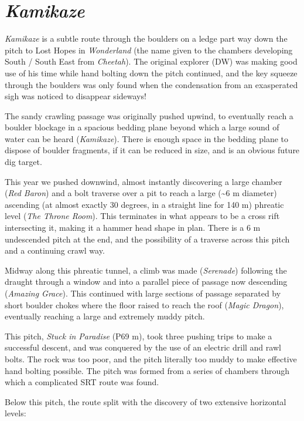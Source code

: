 \hypertarget{kamikaze}{%
\section{\texorpdfstring{\emph{Kamikaze}}{Kamikaze}}\label{kamikaze}}

\emph{Kamikaze} is a subtle route through the boulders on a ledge part
way down the pitch to Lost Hopes in \emph{Wonderland} (the name given to
the chambers developing South / South East from \emph{Cheetah}). The
original explorer (DW) was making good use of his time while hand
bolting down the pitch continued, and the key squeeze through the
boulders was only found when the condensation from an exasperated sigh
was noticed to disappear sideways!

The sandy crawling passage was originally pushed upwind, to eventually
reach a boulder blockage in a spacious bedding plane beyond which a
large sound of water can be heard (\emph{Kamikaze}). There is enough
space in the bedding plane to dispose of boulder fragments, if it can be
reduced in size, and is an obvious future dig target.

This year we pushed downwind, almost instantly discovering a large
chamber (\emph{Red Baron}) and a bolt traverse over a pit to reach a
large (\textasciitilde 6 m diameter) ascending (at almost exactly 30
degrees, in a straight line for 140 m) phreatic level (\emph{The Throne
Room}). This terminates in what appears to be a cross rift intersecting
it, making it a hammer head shape in plan. There is a 6 m undescended
pitch at the end, and the possibility of a traverse across this pitch
and a continuing crawl way.

Midway along this phreatic tunnel, a climb was made (\emph{Serenade})
following the draught through a window and into a parallel piece of
passage now descending (\emph{Amazing Grace}). This continued with large
sections of passage separated by short boulder chokes where the floor
raised to reach the roof (\emph{Magic Dragon}), eventually reaching a
large and extremely muddy pitch.

This pitch, \emph{Stuck in Paradise} (P69 m), took three pushing trips
to make a successful descent, and was conquered by the use of an
electric drill and rawl bolts. The rock was too poor, and the pitch
literally too muddy to make effective hand bolting possible. The pitch
was formed from a series of chambers through which a complicated SRT
route was found.

Below this pitch, the route split with the discovery of two extensive
horizontal levels:


